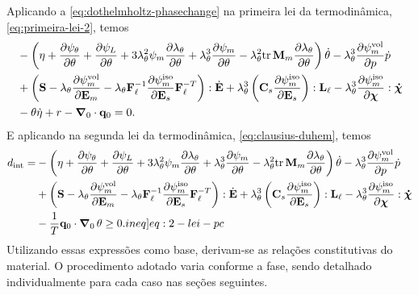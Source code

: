 \documentclass[Tese.tex]{subfiles}
\begin{document}
Aplicando a \cref{eq:dothelmholtz-phasechange} na primeira lei da termodinâmica, \cref{eq:primeira-lei-2}, temos
\begin{equation}
\begin{aligned}
&-\left(\eta+\dfrac{\partial\psi_{\theta}}{\partial\theta} + \dfrac{\partial\psi_L}{\partial\theta} + 3\lambda_{\theta}^2\psi_m\dfrac{\partial\lambda_{\theta}}{\partial\theta} + \lambda_{\theta}^3\dfrac{\partial\psi_m}{\partial\theta} - \lambda_{\theta}^2\text{tr}\,\mathbf{M}_m\dfrac{\partial\lambda_{\theta}}{\partial\theta}\right)\dot{\theta} - \lambda_{\theta}^3\dfrac{\partial\psi_m^\text{vol}}{\partial p}\dot{p}\\
&+\left(\mathbf{S} - \lambda_{\theta}\dfrac{\partial\psi_m^\text{vol}}{\partial\mathbf{E}_m} - \lambda_{\theta}\mathbf{F}_\ell^{-1}\dfrac{\partial\psi_m^\text{iso}}{\partial\mathbf{E}_s}\mathbf{F}_\ell^{-T}\right):\dot{\mathbf{E}} + \lambda_{\theta}^3\left(\mathbf{C}_s\dfrac{\partial\psi_m^\text{iso}}{\partial\mathbf{E}_s}\right):\mathbf{L}_\ell - \lambda_{\theta}^3\dfrac{\partial\psi_m^\text{iso}}{\partial\boldsymbol{\chi}}:\boldsymbol{\dot{\chi}} \\
&-\theta \dot{\eta} + r - \boldsymbol{\nabla}_0\cdot\mathbf{q}_0 = 0. \label{eq:1-lei-pc}
\end{aligned}
\end{equation}
E aplicando na segunda lei da termodinâmica, \cref{eq:clausius-duhem}, temos
\begin{equation}
\begin{aligned}
\dissipation = &-\left(\entropy+\dfrac{\partial\helmholtzt}{\partial\temp} + \dfrac{\partial\helmholtzL}{\partial\temp} + 3\alongTermico^2\helmholtzm\dfrac{\partial\alongTermico}{\partial\temp} + \alongTermico^3\dfrac{\partial\helmholtzm}{\partial\temp} - \alongTermico^2\tr\mandelm\dfrac{\partial\alongTermico}{\partial\temp}\right)\dottemp - \alongTermico^3\dfrac{\partial\helmholtzmvol}{\partial\p}\dotp\\
&+\left(\S - \alongTermico\dfrac{\partial\helmholtzmvol}{\partial\Em} - \alongTermico\Fl^{-1}\dfrac{\partial\helmholtzmiso}{\partial\Es}\Fl^{-T}\right):\dotE + \alongTermico^3\left(\Cs\dfrac{\partial\helmholtzmiso}{\partial\Es}\right):\Ll - \alongTermico^3\dfrac{\partial\helmholtzmiso}{\partial\internalVariables}:\dotInternalVariables \\
& - \dfrac{1}{T}\qi\cdot\gradientei\,\temp \geq 0. \label[ineq]{eq:2-lei-pc}
\end{aligned}
\end{equation}
Utilizando essas expressões como base, derivam-se as relações constitutivas do material. O procedimento adotado varia conforme a fase, sendo detalhado individualmente para cada caso nas seções seguintes.
\end{document}
